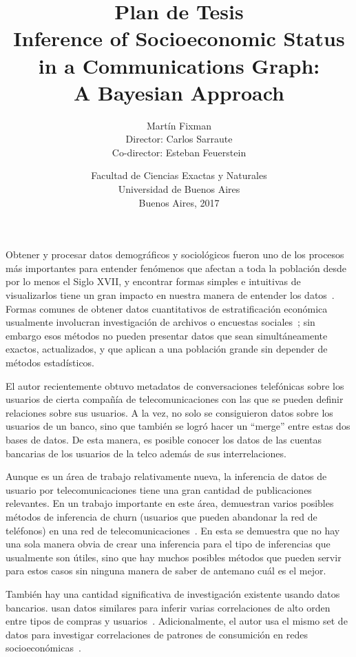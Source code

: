 \documentclass{article}
\title{Plan de Tesis\\\vspace{1em}\Large Inference of Socioeconomic Status\\in a Communications Graph:\\A Bayesian Approach}
\author{{\Large Martín Fixman}\\Director: Carlos Sarraute\\Co-director: Esteban Feuerstein}
\date{{\large Facultad de Ciencias Exactas y Naturales}\\{\large Universidad de Buenos Aires}\\Buenos Aires, 2017}
\begin{document}
\maketitle

\section*{}

Obtener y procesar datos demográficos y sociológicos fueron uno de los procesos más importantes para entender fenómenos que afectan a toda la población desde por lo menos el Siglo XVII, y encontrar formas simples e intuitivas de visualizarlos tiene un gran impacto en nuestra manera de entender los datos~\citep{minard1844,snow1855}. Formas comunes de obtener datos cuantitativos de estratificación económica usualmente involucran investigación de archivos o encuestas sociales~\citep{bulmer1977}; sin embargo esos métodos no pueden presentar datos que sean simultáneamente exactos, actualizados, y que aplican a una población grande sin depender de métodos estadísticos.

El autor recientemente obtuvo metadatos de conversaciones telefónicas sobre los usuarios de cierta compañía de telecomunicaciones con las que se pueden definir relaciones sobre sus usuarios. A la vez, no solo se consiguieron datos sobre los usuarios de un banco, sino que también se logró hacer un ``merge'' entre estas dos bases de datos. De esta manera, es posible conocer los datos de las cuentas bancarias de los usuarios de la telco además de sus interrelaciones.

Aunque es un área de trabajo relativamente nueva, la inferencia de datos de usuario por telecomunicaciones tiene una gran cantidad de publicaciones relevantes. En un trabajo importante en este área, \citeauthor{oskardottir2016} demuestran varios posibles métodos de inferencia de churn (usuarios que pueden abandonar la red de teléfonos) en una red de telecomunicaciones~\cite{oskardottir2016}. En esta se demuestra que no hay una sola manera obvia de crear una inferencia para el tipo de inferencias que usualmente son útiles, sino que hay muchos posibles métodos que pueden servir para estos casos sin ninguna manera de saber de antemano cuál es el mejor.

También hay una cantidad significativa de investigación existente usando datos bancarios. \citeauthor{leo2015socioeconomic} usan datos similares para inferir varias correlaciones de alto orden entre tipos de compras y usuarios~\cite{leo2015socioeconomic}. Adicionalmente, el autor usa el mismo set de datos para investigar correlaciones de patrones de consumición en redes socioeconómicas~\cite{leo16correlations}.
\end{document}
